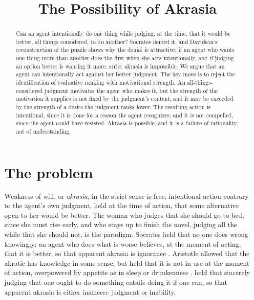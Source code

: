 \documentclass{situationist-preprint}
\title{The Possibility of Akrasia}
\begin{document}
\maketitle

\begin{abstract}
Can an agent intentionally do one thing while judging, at the time, that it would be better, all things considered, to do another? Socrates denied it, and Davidson's reconstruction of the puzzle shows why the denial is attractive: if an agent who wants one thing more than another does the first when she acts intentionally, and if judging an option better is wanting it more, strict akrasia is impossible. We argue that an agent can intentionally act against her better judgment. The key move is to reject the identification of evaluative ranking with motivational strength. An all-things-considered judgment motivates the agent who makes it, but the strength of the motivation it supplies is not fixed by the judgment's content, and it may be exceeded by the strength of a desire the judgment ranks lower. The resulting action is intentional, since it is done for a reason the agent recognizes, and it is not compelled, since the agent could have resisted. Akrasia is possible, and it is a failure of rationality, not of understanding.
\end{abstract}

\section{The problem}

Weakness of will, or \emph{akrasia}, in the strict sense is free, intentional action contrary to the agent's own judgment, held at the time of action, that some alternative open to her would be better. The woman who judges that she should go to bed, since she must rise early, and who stays up to finish the novel, judging all the while that she should not, is the paradigm. Socrates held that no one does wrong knowingly: an agent who does what is worse believes, at the moment of acting, that it is better, so that apparent akrasia is ignorance \citep[352b--358d]{PlatoProtagoras}. Aristotle allowed that the akratic has knowledge in some sense, but held that it is not in use at the moment of action, overpowered by appetite as in sleep or drunkenness \citep[VII.3]{AristotleNE}. \citet{Hare1952} held that sincerely judging that one ought to do something entails doing it if one can, so that apparent akrasia is either insincere judgment or inability.
\end{document}
